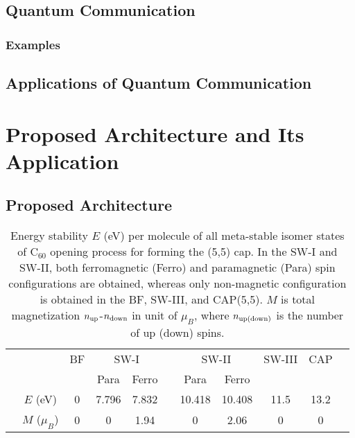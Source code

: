 \documentclass[master,english,draft,pdfdoc]{kaist-ucs}
\begin{document}
\section{Quantum Communication}


\subsection{Examples}


\section{Applications of Quantum Communication}



\chapter{Proposed Architecture and Its Application}

\section{Proposed Architecture}


\begin{table}[t]
\caption[Enter the caption title here]{Energy stability $E$ (eV) per molecule of all meta-stable
isomer states of C$_{60}$ opening process for forming the (5,5) cap.
In the SW-I and SW-II, both ferromagnetic (Ferro) and paramagnetic (Para)
spin configurations are obtained, whereas only non-magnetic configuration
is obtained in the BF, SW-III, and CAP(5,5).
$M$ is total magnetization $n_{\rm up}$-$n_{\rm down}$ in unit of $\mu_B$, where
$n_{\rm up(down)}$ is the number of up (down) spins.
}
\label{mag-tab1}
\begin{center}
\begin{tabular} {ccccccccccc}
\hline\hline
& & BF &\multicolumn{2}{c}{SW-I}&&\multicolumn{2}{c}{SW-II}&SW-III&CAP&\\
\cline{4-5} \cline{7-8}
&               &   &  Para & Ferro &&   Para &  Ferro &      &      &\\
\hline
& $E$ (eV)      & 0 & 7.796 & 7.832 && 10.418 & 10.408 & 11.5 & 13.2 &\\
& $M$ ($\mu_B$) & 0 &     0 &  1.94 &&      0 &   2.06 &    0 &    0 &\\
\hline\hline
\end{tabular}
\end{center}
\end{table}
\end{document}
